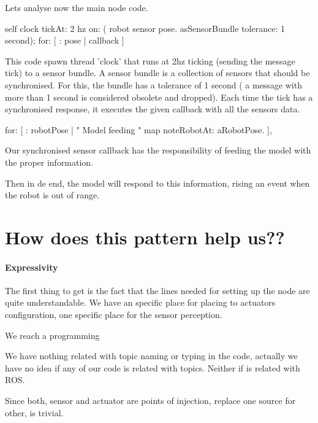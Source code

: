 \documentclass[a4paper,10pt,twoside]{book}
\begin{document}
					
					Lets analyse now the main node code. 
					
				\begin{code}
					self clock tickAt: 2 hz on: ({
						robot sensor pose.
					} asSensorBundle tolerance: 1 second);
					for: [ : pose | callback ]
				\end{code}
					
					This code spawn thread 'clock' that runs at 2hz ticking (sending the message tick) to a sensor bundle. A sensor bundle is a collection of sensors that should be synchronised. For this, the bundle has a tolerance of 1 second ( a message with more than 1 second is considered obsolete and dropped). Each time the tick has a synchronised response, it executes the given callback with all the sensors data. 
					
					
				\begin{code}
					  for: [  : robotPose |
						" Model feeding "
				 		  map noteRobotAt: aRobotPose.
					],
				\end{code}
					
					
				Our synchronised sensor callback has the responsibility of feeding the model with the proper information. 
				
				Then in de end, the model will respond to this information, rising an event when the robot is out of range.
					
				
				
				\section{How does this pattern help us??} 
				
				\paragraph { Expressivity }
				
				The first thing to get is the fact that the lines needed for setting up the node are quite understandable. We have an specific place for placing to actuators configuration, one specific place for the sensor perception. 
				
				We reach a programming 
				
				
				We have nothing related with topic naming or typing in the code, actually we have no idea if any of our code is related with topics. Neither if is related with ROS.
				
				
				Since both, sensor and actuator are points of injection, replace one source for other, is trivial. 
				
\end{document}
